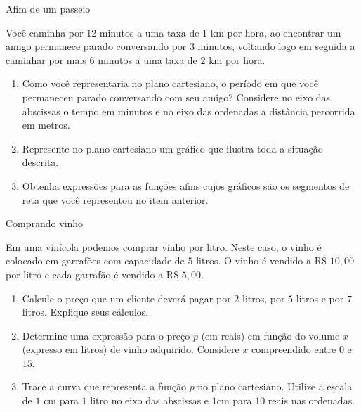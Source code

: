 \label{\detokenize{AF107-A::doc}}\label{\detokenize{AF107-A:para-saber-mais-funcao-afim-por-partes}}
\begin{task}{Afim de um passeio}

Você caminha por \(12\) minutos a uma taxa de \(1\) km por hora,  ao encontrar um amigo permanece parado conversando por \(3\) minutos, voltando logo em seguida  a caminhar por mais \(6\) minutos a uma taxa de \(2\) km por hora.
\begin{enumerate}
\item {} 
Como você representaria no plano cartesiano, o período em que você permaneceu parado conversando com seu amigo? Considere no eixo das abscissas o tempo em minutos e no eixo das ordenadas a distância percorrida em metros.

\item {} 
Represente no plano cartesiano um gráfico que ilustra toda a situação descrita.

\item {} 
Obtenha expressões para as funções afins cujos gráficos são os segmentos de reta que você representou no item anterior.

\end{enumerate}
\end{task}

\begin{task}{Comprando vinho}

Em uma vinícola podemos comprar vinho por litro. Neste caso, o vinho é colocado em garrafões com capacidade de \(5\) litros. O vinho é vendido a R\$ \(10{,}00\) por litro e cada garrafão é vendido a R\$ \(5{,}00\).
\begin{enumerate}
\item {} 
Calcule o preço que um cliente deverá pagar por \(2\) litros, por \(5\) litros e por \(7\) litros. Explique seus cálculos.

\item {} 
Determine uma expressão para o preço \(p\) (em reais) em função do volume \(x\) (expresso em litros) de vinho adquirido. Considere \(x\) compreendido entre \(0\) e \(15\).

\item {} 
Trace a curva que representa a função \(p\) no plano cartesiano. Utilize a escala de \(1\) cm para \(1\) litro no eixo das abscissas e \(1\)cm para \(10\) reais nas ordenadas.

\end{enumerate}
\end{task}

